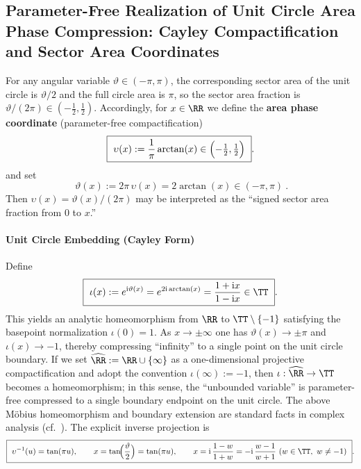 \subsection{Parameter-Free Realization of Unit Circle Area Phase Compression: Cayley Compactification and Sector Area Coordinates}\label{subsec:unit-circle-phase-lift}
For any angular variable \(\vartheta\in(-\pi,\pi)\), the corresponding sector area of the unit circle is \(\vartheta/2\) and the full circle area is \(\pi\), so the sector area fraction is \(\vartheta/(2\pi)\in(-\tfrac12,\tfrac12)\).
Accordingly, for \(x\in\RR\) we define the \textbf{area phase coordinate} (parameter-free compactification)
\begin{equation}\label{eq:unit-circle-phase-upsilon}
\boxed{\ \upsilon(x):=\frac{1}{\pi}\arctan(x)\in\Bigl(-\tfrac12,\tfrac12\Bigr)\ }.
\end{equation}
and set
\begin{equation}\label{eq:unit-circle-phase-vartheta}
\boxed{\ \vartheta(x):=2\pi\,\upsilon(x)=2\arctan(x)\in(-\pi,\pi)\ }.
\end{equation}
Then \(\upsilon(x)=\vartheta(x)/(2\pi)\) may be interpreted as the ``signed sector area fraction from \(0\) to \(x\).''

\paragraph{Unit Circle Embedding (Cayley Form)}
Define
\begin{equation}\label{eq:unit-circle-cayley-embed}
\boxed{\ \iota(x):=e^{\mathrm{i}\vartheta(x)}=e^{2\mathrm{i}\arctan(x)}=\frac{1+\mathrm{i}x}{1-\mathrm{i}x}\in\TT\ }.
\end{equation}
This yields an analytic homeomorphism from \(\RR\) to \(\TT\setminus\{-1\}\) satisfying the basepoint normalization \(\iota(0)=1\).
As \(x\to\pm\infty\) one has \(\vartheta(x)\to\pm\pi\) and \(\iota(x)\to-1\), thereby compressing ``infinity'' to a single point on the unit circle boundary.
If we set \(\widehat{\RR}:=\RR\cup\{\infty\}\) as a one-dimensional projective compactification and adopt the convention \(\iota(\infty):=-1\), then \(\iota:\widehat{\RR}\to\TT\) becomes a homeomorphism; in this sense, the ``unbounded variable'' is parameter-free compressed to a single boundary endpoint on the unit circle.
The above M\"obius homeomorphism and boundary extension are standard facts in complex analysis (cf.\ \cite{Ahlfors1979ComplexAnalysis}).
The explicit inverse projection is
\begin{equation}\label{eq:unit-circle-phase-inverse}
\boxed{\ \upsilon^{-1}(u)=\tan(\pi u),\qquad x=\tan\!\Bigl(\frac{\vartheta}{2}\Bigr)=\tan(\pi u),\qquad
x=\mathrm{i}\,\frac{1-w}{1+w}=-\mathrm{i}\,\frac{w-1}{w+1}\ (w\in\TT,\ w\neq-1)\ }.
\end{equation}

